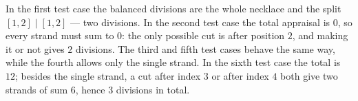 In the first test case the balanced divisions are the whole necklace and the split $[1, 2] \mid [1, 2]$ --- two divisions. In the second test case the total appraisal is $0$, so every strand must sum to $0$: the only possible cut is after position $2$, and making it or not gives $2$ divisions. The third and fifth test cases behave the same way, while the fourth allows only the single strand. In the sixth test case the total is $12$; besides the single strand, a cut after index $3$ or after index $4$ both give two strands of sum $6$, hence $3$ divisions in total.
